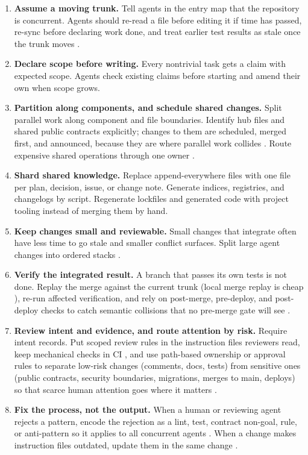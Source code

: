\documentclass[11pt]{article}
\begin{document}
\begin{enumerate}[leftmargin=*]
  \item \textbf{Assume a moving trunk.} Tell agents in the entry map that the repository is concurrent. Agents should re-read a file before editing it if time has passed, re-sync before declaring work done, and treat earlier test results as stale once the trunk moves \cite{zheng2026corvus,hsu2026eagraph}.
  \item \textbf{Declare scope before writing.} Every nontrivial task gets a claim with expected scope. Agents check existing claims before starting and amend their own when scope grows.
  \item \textbf{Partition along components, and schedule shared changes.} Split parallel work along component and file boundaries. Identify hub files and shared public contracts explicitly; changes to them are scheduled, merged first, and announced, because they are where parallel work collides \cite{osmani2026cloud,muku2026npbench}. Route expensive shared operations through one owner \cite{anthropic2026migrations}.
  \item \textbf{Shard shared knowledge.} Replace append-everywhere files with one file per plan, decision, issue, or change note. Generate indices, registries, and changelogs by script. Regenerate lockfiles and generated code with project tooling instead of merging them by hand.
  \item \textbf{Keep changes small and reviewable.} Small changes that integrate often have less time to go stale and smaller conflict surfaces. Split large agent changes into ordered stacks \cite{muiruri2026stack}.
  \item \textbf{Verify the integrated result.} A branch that passes its own tests is not done. Replay the merge against the current trunk (local merge replay is cheap \cite{subramanian2026lineage}), re-run affected verification, and rely on post-merge, pre-deploy, and post-deploy checks to catch semantic collisions that no pre-merge gate will see \cite{anthropic2026scion,muku2026npbench,lalkaka2026rollouts}.
  \item \textbf{Review intent and evidence, and route attention by risk.} Require intent records. Put scoped review rules in the instruction files reviewers read, keep mechanical checks in CI \cite{srikanth2026reviewrules}, and use path-based ownership or approval rules to separate low-risk changes (comments, docs, tests) from sensitive ones (public contracts, security boundaries, migrations, merges to main, deploys) so that scarce human attention goes where it matters \cite{anthropic2026scion,anthropic2026block}.
  \item \textbf{Fix the process, not the output.} When a human or reviewing agent rejects a pattern, encode the rejection as a lint, test, contract non-goal, rule, or anti-pattern so it applies to all concurrent agents \cite{anthropic2026migrations,cursor2026projects}. When a change makes instruction files outdated, update them in the same change \cite{anthropic2026codereview}.
\end{enumerate}
\end{document}
